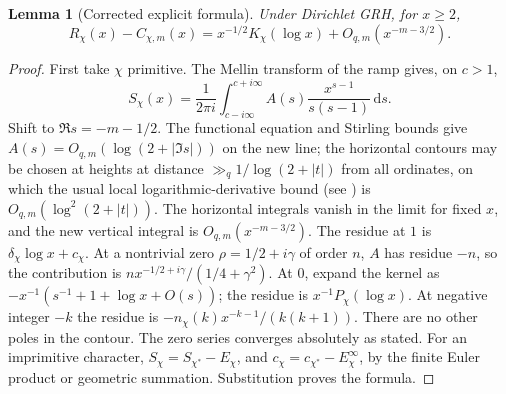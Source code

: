 \documentclass[11pt,letterpaper]{article}
\newtheorem{lemma}[theorem]{Lemma}
\theoremstyle{remark}\newtheorem{remark}[theorem]{Remark}
\newcommand{\dd}{\,\mathrm d}\newcommand{\sinc}{\operatorname{sinc}}
\begin{document}
\begin{lemma}[Corrected explicit formula]\label{lem:ramp}
Under Dirichlet GRH, for $x\ge2$,
\[
 R_\chi(x)-C_{\chi,m}(x)=x^{-1/2}K_\chi(\log x)+O_{q,m}(x^{-m-3/2}).
\]
\end{lemma}
\begin{proof}
First take $\chi$ primitive. The Mellin transform of the ramp gives, on $c>1$,
\[
 S_\chi(x)=\frac1{2\pi i}\int_{c-i\infty}^{c+i\infty}
 A(s)\frac{x^{s-1}}{s(s-1)}\dd s.
\]
Shift to $\Re s=-m-1/2$. The functional equation and Stirling bounds give $A(s)=O_{q,m}(\log(2+|\Im s|))$ on the new line; the horizontal contours may be chosen at heights at distance $\gg_q 1/\log(2+|t|)$ from all ordinates, on which the usual local logarithmic-derivative bound (see \cite{Davenport}) is $O_{q,m}(\log^2(2+|t|))$. The horizontal integrals vanish in the limit for fixed $x$, and the new vertical integral is $O_{q,m}(x^{-m-3/2})$. The residue at $1$ is $\delta_\chi\log x+c_\chi$. At a nontrivial zero $\rho=1/2+i\gamma$ of order $n$, $A$ has residue $-n$, so the contribution is $n x^{-1/2+i\gamma}/(1/4+\gamma^2)$. At $0$, expand the kernel as $-x^{-1}(s^{-1}+1+\log x+O(s))$; the residue is $x^{-1}P_\chi(\log x)$. At negative integer $-k$ the residue is $-n_\chi(k)x^{-k-1}/(k(k+1))$. There are no other poles in the contour. The zero series converges absolutely as stated. For an imprimitive character, $S_\chi=S_{\chi^*}-E_\chi$, and $c_\chi=c_{\chi^*}-E_\chi^\infty$, by the finite Euler product or geometric summation. Substitution proves the formula.
\end{proof}
\end{document}
